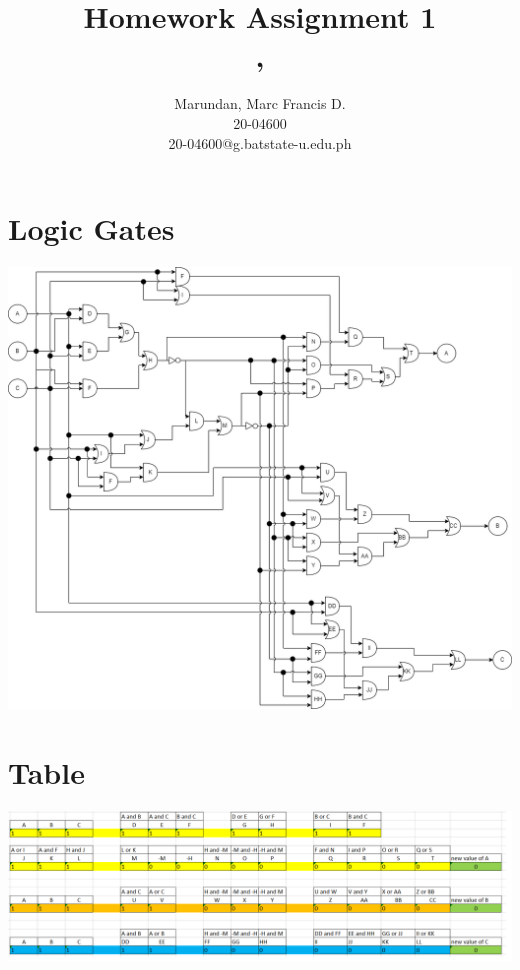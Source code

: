 \documentclass{article}
\title{
Homework Assignment 1 \hfill\\
\small
\coursecode, \coursename
}
\author{
Marundan, Marc Francis D. \hfill\\
20-04600 \hfill\\
\small
20-04600@g.batstate-u.edu.ph
}
\begin{document}
\maketitle

\section{Logic Gates}

\begin{center}
\includegraphics[width = 1\textwidth]{gates.png}
\end{center}

\section{Table}

\begin{center}
\includegraphics[width = 1\textwidth]{table.png}
\end{center}
\end{document}
